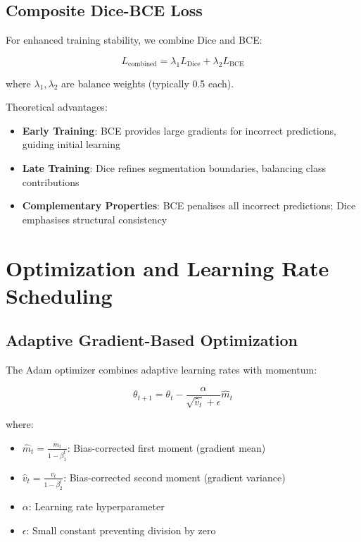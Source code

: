 \documentclass{ecsproject}     %
\begin{document}
\subsection{Composite Dice-BCE Loss}

For enhanced training stability, we combine Dice and BCE:

\begin{equation}
L_{\text{combined}} = \lambda_1 L_{\text{Dice}} + \lambda_2 L_{\text{BCE}}
\label{Eq:CompositeLoss}
\end{equation}

where $\lambda_1, \lambda_2$ are balance weights (typically 0.5 each).

Theoretical advantages:
\begin{itemize}
    \item \textbf{Early Training}: BCE provides large gradients for incorrect predictions, guiding initial learning
    \item \textbf{Late Training}: Dice refines segmentation boundaries, balancing class contributions
    \item \textbf{Complementary Properties}: BCE penalises all incorrect predictions; Dice emphasises structural consistency
\end{itemize}

\section{Optimization and Learning Rate Scheduling}

\subsection{Adaptive Gradient-Based Optimization}

The Adam optimizer combines adaptive learning rates with momentum:

\begin{equation}
\theta_{t+1} = \theta_t - \frac{\alpha}{\sqrt{\hat{v}_t} + \epsilon} \hat{m}_t
\label{Eq:Adam}
\end{equation}

where:
\begin{itemize}
    \item $\hat{m}_t = \frac{m_t}{1-\beta_1^t}$: Bias-corrected first moment (gradient mean)
    \item $\hat{v}_t = \frac{v_t}{1-\beta_2^t}$: Bias-corrected second moment (gradient variance)
    \item $\alpha$: Learning rate hyperparameter
    \item $\epsilon$: Small constant preventing division by zero
\end{itemize}
\end{document}
